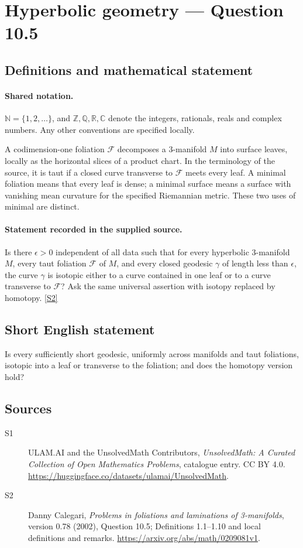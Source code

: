 \documentclass[11pt]{article}
\newcommand{\sref}[2]{\hyperlink{source:#1:#2}{[S#2]}}
\begin{document}
\section{Hyperbolic geometry — Question 10.5}\label{statement}

\subsection{Definitions and mathematical statement}

\paragraph{Shared notation.}$\mathbb N=\{1,2,\ldots\}$, and $\mathbb Z,\mathbb Q,\mathbb R,\mathbb C$ denote the integers, rationals, reals and complex numbers. Any other conventions are specified locally.


A codimension-one foliation $\mathcal F$ decomposes a $3$-manifold $M$ into surface leaves, locally as the horizontal slices of a product chart. In the terminology of the source, it is taut if a closed curve transverse to $\mathcal F$ meets every leaf. A minimal foliation means that every leaf is dense; a minimal surface means a surface with vanishing mean curvature for the specified Riemannian metric. These two uses of minimal are distinct.
\paragraph{Statement recorded in the supplied source.}
Is there $\epsilon>0$ independent of all data such that for every hyperbolic $3$-manifold $M$, every taut foliation $\mathcal F$ of $M$, and every closed geodesic $\gamma$ of length less than $\epsilon$, the curve $\gamma$ is isotopic either to a curve contained in one leaf or to a curve transverse to $\mathcal F$? Ask the same universal assertion with isotopy replaced by homotopy. \sref{statement}{2}
\subsection{Short English statement}
Is every sufficiently short geodesic, uniformly across manifolds and taut foliations, isotopic into a leaf or transverse to the foliation; and does the homotopy version hold?
\subsection{Sources}
\begin{description}
\item[\hypertarget{source:statement:1}{S1}] ULAM.AI and the UnsolvedMath Contributors, \emph{UnsolvedMath: A Curated Collection of Open Mathematics Problems}, catalogue entry. CC BY 4.0. \url{https://huggingface.co/datasets/ulamai/UnsolvedMath}.
\item[\hypertarget{source:statement:2}{S2}] Danny Calegari, \emph{Problems in foliations and laminations of 3-manifolds}, version 0.78 (2002), Question 10.5; Definitions 1.1--1.10 and local definitions and remarks. \url{https://arxiv.org/abs/math/0209081v1}.
\end{description}
\label{end:statement}
\end{document}
